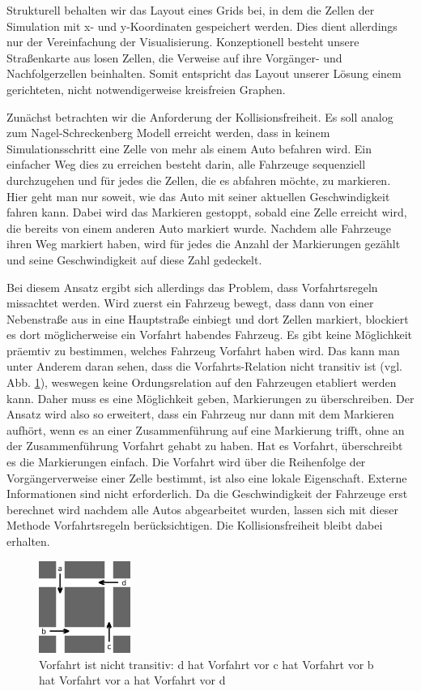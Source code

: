 \documentclass[10pt, a4paper]{article}
\begin{document}
Strukturell behalten wir das Layout eines Grids bei, in dem die Zellen der Simulation mit x- und y-Koordinaten gespeichert werden. Dies dient allerdings nur der Vereinfachung der Visualisierung. Konzeptionell besteht unsere Straßenkarte aus losen Zellen, die Verweise auf ihre Vorgänger- und Nachfolgerzellen beinhalten. Somit entspricht das Layout unserer Lösung einem gerichteten, nicht notwendigerweise kreisfreien Graphen.

Zunächst betrachten wir die Anforderung der Kollisionsfreiheit. Es soll analog zum Nagel-Schrecken\-berg Modell \cite{nagel-schreckenberg} erreicht werden, dass in keinem Simulationsschritt eine Zelle von mehr als einem Auto befahren wird. Ein einfacher Weg dies zu erreichen besteht darin, alle Fahrzeuge sequenziell durchzugehen und für jedes die Zellen, die es abfahren möchte, zu markieren. Hier geht man nur soweit, wie das Auto mit seiner aktuellen Geschwindigkeit fahren kann. Dabei wird das Markieren gestoppt, sobald eine Zelle erreicht wird, die bereits von einem anderen Auto markiert wurde. Nachdem alle Fahrzeuge ihren Weg markiert haben, wird für jedes die Anzahl der Markierungen gezählt und seine Geschwindigkeit auf diese Zahl gedeckelt.

Bei diesem Ansatz ergibt sich allerdings das Problem, dass Vorfahrtsregeln missachtet werden. Wird zuerst ein Fahrzeug bewegt, dass dann von einer Nebenstraße aus in eine Hauptstraße einbiegt und dort Zellen markiert, blockiert es dort möglicherweise ein Vorfahrt habendes Fahrzeug. Es gibt keine Möglichkeit präemtiv zu bestimmen, welches Fahrzeug Vorfahrt haben wird. Das kann man unter Anderem daran sehen, dass die Vorfahrts-Relation nicht transitiv ist (vgl. Abb. \ref{fig:rightOfWayNotTransitive}), weswegen keine Ordungsrelation auf den Fahrzeugen etabliert werden kann. Daher muss es eine Möglichkeit geben, Markierungen zu überschreiben. Der Ansatz wird also so erweitert, dass ein Fahrzeug nur dann mit dem Markieren aufhört, wenn es an einer Zusammenführung auf eine Markierung trifft, ohne an der Zusammenführung Vorfahrt gehabt zu haben. Hat es Vorfahrt, überschreibt es die Markierungen einfach. Die Vorfahrt wird über die Reihenfolge der Vorgängerverweise einer Zelle bestimmt, ist also eine lokale Eigenschaft. Externe Informationen sind nicht erforderlich. Da die Geschwindigkeit der Fahrzeuge erst berechnet wird nachdem alle Autos abgearbeitet wurden, lassen sich mit dieser Methode Vorfahrtsregeln berücksichtigen. Die Kollisionsfreiheit bleibt dabei erhalten.
\begin{figure}[h!]
	\centering
	\includegraphics[width=3cm]{img/rightOfWay}
	\caption{Vorfahrt ist nicht transitiv: d hat Vorfahrt vor c hat Vorfahrt vor b hat Vorfahrt vor a hat Vorfahrt vor d}
	\label{fig:rightOfWayNotTransitive}
\end{figure}
\end{document}

